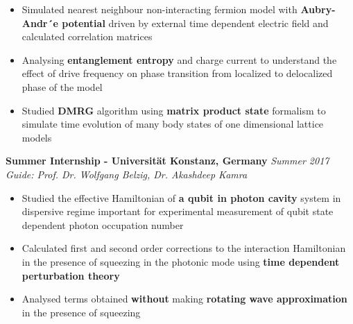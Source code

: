 \documentclass[10pt]{article}%
\begin{document}
{\begin{itemize}
    \setlength\itemsep{0.01em}
    \item Simulated nearest neighbour non-interacting fermion model with \textbf{Aubry-Andr´e potential} driven by external time dependent electric field and calculated correlation matrices
    \item Analysing \textbf{entanglement entropy} and charge current to understand the effect of drive frequency on phase transition from localized to delocalized phase of the model
    \item Studied \textbf{DMRG} algorithm using \textbf{matrix product state} formalism to simulate time evolution of many body states of one dimensional lattice models
\end{itemize}

{\flushleft \bf \large{Summer Internship - Universit\"{a}t Konstanz, Germany}}  \hfill \textit{Summer 2017} \\
{\em Guide: Prof. Dr. Wolfgang Belzig, Dr. Akashdeep Kamra }\\
\vspace{-5mm}
\begin{itemize}
    \setlength\itemsep{0.01em}
    \item Studied the effective Hamiltonian of \textbf{a qubit in photon cavity} system in dispersive regime important for experimental measurement of qubit state dependent photon occupation number
    \item Calculated first and second order corrections to the interaction Hamiltonian in the presence of squeezing in the photonic mode using \textbf{time dependent perturbation theory}
    \item Analysed terms obtained \textbf{without} making \textbf{rotating wave approximation} in the presence of squeezing
\end{itemize}



}
\end{document}
